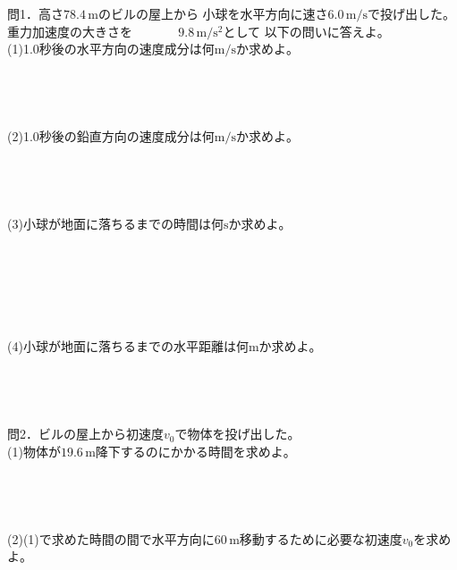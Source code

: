 \documentclass[11pt,twoside]{article}
\begin{document}
	
	問1．高さ$78.4\,\si{\metre}$のビルの屋上から
	小球を水平方向に速さ$6.0\,\si{\metre\per\second}$で投げ出した。
	重力加速度の大きさを　　　\,\,\,\,$9.8\,\si{\metre\per\second\squared}$として
	以下の問いに答えよ。\\
	(1)1.0秒後の水平方向の速度成分は何$\si{\metre\per\second}$か求めよ。\\\\\\\\\\
	(2)1.0秒後の鉛直方向の速度成分は何$\si{\metre\per\second}$か求めよ。\\\\\\\\\\
	(3)小球が地面に落ちるまでの時間は何$\si{\second}$か求めよ。\\\\\\\\\\\\\\
	(4)小球が地面に落ちるまでの水平距離は何$\si{\metre}$か求めよ。\\\\\\\\\\
	問2．ビルの屋上から初速度$v_0$で物体を投げ出した。\\
	(1)物体が$19.6\,\si{\metre}$降下するのにかかる時間を求めよ。\\\\\\\\\\
	(2)(1)で求めた時間の間で水平方向に$60\,\si{\metre}$移動するために必要な初速度$v_0$を求めよ。\\\\\\\\\\
	
\end{document}
